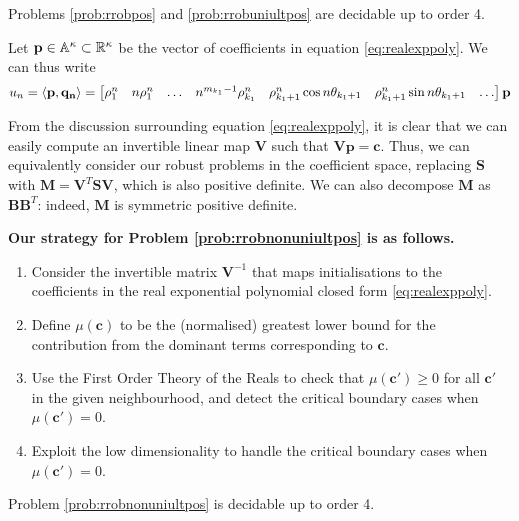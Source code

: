 \begin{theorem}
\label{thm:decide}
Problems \ref{prob:rrobpos} and \ref{prob:rrobuniultpos} are decidable up to order 4.
\end{theorem}





Let $\mathbf{p} \in \mathbb{A}^{\kappa} \subset \mathbb{R}^\kappa$ be the vector of coefficients in equation \ref{eq:realexppoly}. We can thus write
\begin{equation}
\label{eq:innerprod}
u_n = \langle\mathbf{p}, \mathbf{q_n}\rangle= 
\begin{bmatrix}
\rho_1^n & n \rho_1^n & \dots & n^{m_{k_1}-1}\rho_{k_1}^n & \rho_{k_1+1}^n\cos n\theta_{k_1+1} & \rho_{k_1+1}^n\sin n\theta_{k_1+1} & \dots
\end{bmatrix}\mathbf{p}
\end{equation}

From the discussion surrounding equation \ref{eq:realexppoly}, it is clear that we can easily compute an invertible linear map $\mathbf{V}$ such that $\mathbf{Vp} = \mathbf{c}$. Thus, we can equivalently consider our robust problems in the coefficient space, replacing $\mathbf{S}$ with $\mathbf{M} = \mathbf{V}^T\mathbf{SV}$, which is also positive definite. We can also decompose $\mathbf{M}$ as $\mathbf{B}\mathbf{B}^T$: indeed, $\mathbf{M}$ is symmetric positive definite. 

\textbf{Our strategy for Problem \ref{prob:rrobnonuniultpos} is as follows.}
\begin{enumerate}
\item Consider the invertible matrix $\mathbf{V}^{-1}$ that maps initialisations to the coefficients in the real exponential polynomial closed form \ref{eq:realexppoly}.
\item Define $\mu(\mathbf{c})$ to be the (normalised) greatest lower bound for the contribution from the dominant terms corresponding to $\mathbf{c}$.
\item Use the First Order Theory of the Reals to check that $\mu(\mathbf{c'}) \ge 0$ for all $\mathbf{c'}$ in the given neighbourhood, and detect the critical boundary cases when $\mu(\mathbf{c'}) = 0$.
\item Exploit the low dimensionality to handle the critical boundary cases when $\mu(\mathbf{c'}) = 0$.
\end{enumerate}

\begin{theorem}
\label{thm:decide2}
Problem \ref{prob:rrobnonuniultpos} is decidable up to order 4.
\end{theorem}




